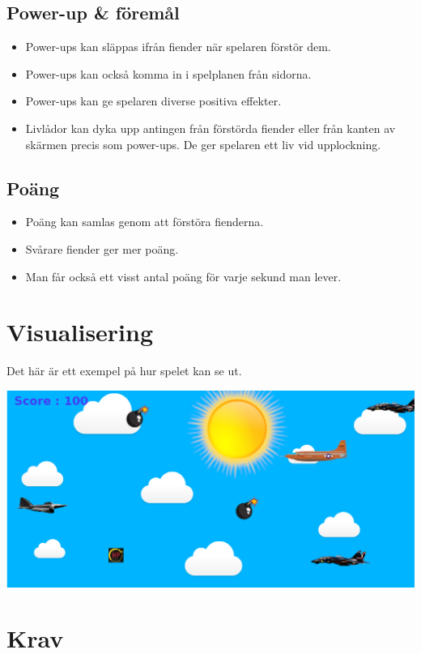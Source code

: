 \documentclass{TDP005mall}
\begin{document}
\subsection{Power-up \& föremål}
\begin{itemize}
\item Power-ups kan släppas ifrån fiender när spelaren förstör dem.
\item Power-ups kan också komma in i spelplanen från sidorna.
\item Power-ups kan ge spelaren diverse positiva effekter.
\item Livlådor kan dyka upp antingen från förstörda fiender eller från kanten av skärmen precis som power-ups. De ger spelaren ett liv vid upplockning. %
\end{itemize}

\subsection{Poäng}
\begin{itemize}
\item Poäng kan samlas genom att förstöra fienderna.
\item Svårare fiender ger mer poäng.
\item Man får också ett visst antal poäng för varje sekund man lever.
\end{itemize}

\newpage
\section{Visualisering}
Det här är ett exempel på hur spelet kan se ut.


\includegraphics[scale=0.35]{Images/Game.png}

\section{Krav}
\end{document}
